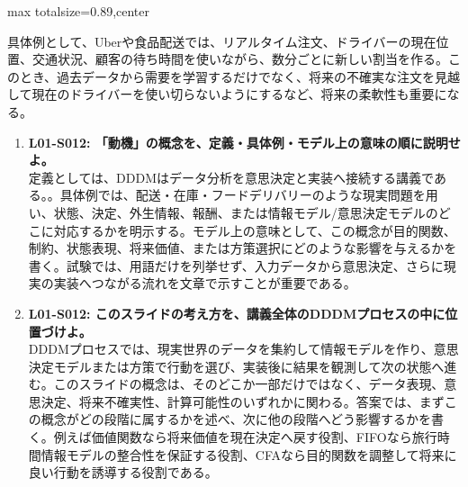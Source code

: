 \begin{minipage}[t]{0.58\textwidth}
\begin{adjustbox}{max totalsize={\textwidth}{0.89\textheight},center}
\begin{minipage}{\textwidth}
具体例として、Uberや食品配送では、リアルタイム注文、ドライバーの現在位置、交通状況、顧客の待ち時間を使いながら、数分ごとに新しい割当を作る。このとき、過去データから需要を学習するだけでなく、将来の不確実な注文を見越して現在のドライバーを使い切らないようにするなど、将来の柔軟性も重要になる。\par{}\begin{enumerate}\item \textbf{L01-S012: 「動機」の概念を、定義・具体例・モデル上の意味の順に説明せよ。}\\定義としては、DDDMはデータ分析を意思決定と実装へ接続する講義である。。具体例では、配送・在庫・フードデリバリーのような現実問題を用い、状態、決定、外生情報、報酬、または情報モデル/意思決定モデルのどこに対応するかを明示する。モデル上の意味として、この概念が目的関数、制約、状態表現、将来価値、または方策選択にどのような影響を与えるかを書く。試験では、用語だけを列挙せず、入力データから意思決定、さらに現実の実装へつながる流れを文章で示すことが重要である。\item \textbf{L01-S012: このスライドの考え方を、講義全体のDDDMプロセスの中に位置づけよ。}\\DDDMプロセスでは、現実世界のデータを集約して情報モデルを作り、意思決定モデルまたは方策で行動を選び、実装後に結果を観測して次の状態へ進む。このスライドの概念は、そのどこか一部だけではなく、データ表現、意思決定、将来不確実性、計算可能性のいずれかに関わる。答案では、まずこの概念がどの段階に属するかを述べ、次に他の段階へどう影響するかを書く。例えば価値関数なら将来価値を現在決定へ戻す役割、FIFOなら旅行時間情報モデルの整合性を保証する役割、CFAなら目的関数を調整して将来に良い行動を誘導する役割である。\end{enumerate}
\end{minipage}
\end{adjustbox}
\end{minipage}


